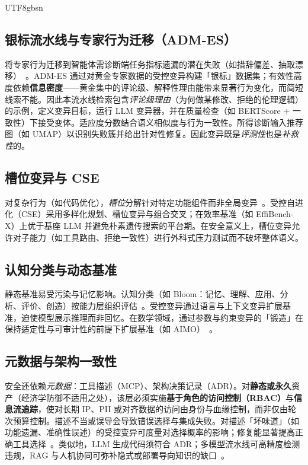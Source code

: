 \documentclass[letterpaper,twocolumn,10pt]{article}
\begin{document}
\begin{CJK}{UTF8}{gbsn}
\subsection{银标流水线与专家行为迁移（ADM-ES）}

将专家行为迁移到智能体需诊断端任务指标遗漏的潜在失败（如措辞偏差、抽取漂移）~\cite{adm-es-arxiv}。ADM-ES 通过对黄金专家数据的受控变异构建「银标」数据集；有效性高度依赖\textbf{信息密度}——黄金集中的评论级、解释性理由能带来显著行为变化，而简短线索不能。因此本流水线检索包含\emph{评论级理由}（为何做某修改、拒绝的伦理逻辑）的示例，定义变异目标，运行 LLM 变异器，并在质量检查（如 BERTScore + 一致性）下接受变体。适应度分数结合语义相似度与行为一致性。所得诊断输入推荐图（如 UMAP）以识别失败簇并给出针对性修复。因此变异既是\emph{评测性}也是\emph{补救性}的。

\subsection{槽位变异与 CSE}

对复杂行为（如代码优化），\emph{槽位}分解针对特定功能组件而非全局变异~\cite{cse-evocontrol,cse-arxiv}。受控自进化（CSE）采用多样化规划、槽位变异与组合交叉；在效率基准（如 EffiBench-X）上优于基座 LLM 并避免朴素遗传搜索的平台期。在安全意义上，槽位变异允许对子能力（如工具路由、拒绝一致性）进行外科式压力测试而不破坏整体语义。

\subsection{认知分类与动态基准}

静态基准易受污染与记忆影响。认知分类（如 Bloom：记忆、理解、应用、分析、评价、创造）按能力层组织评估~\cite{bloom-bugreport}。受控变异通过语言与上下文变异扩展基准，迫使模型展示推理而非回忆。在数学领域，通过参数与约束变异的「锻造」在保持适定性与可审计性的前提下扩展基准（如 AIMO）~\cite{aimo-benchmark}。

\subsection{元数据与架构一致性}
\label{sec:metadata}

安全还依赖\emph{元数据}：工具描述（MCP）、架构决策记录（ADR）。对\textbf{静态或永久}资产（经济学防御不适用之处），该层必须实施\textbf{基于角色的访问控制（RBAC）}与\textbf{信息流追踪}，使对长期 IP、PII 或对齐数据的访问由身份与血缘控制，而非仅由轮次预算控制。描述不当或误导会导致错误选择与集成失败。对描述「坏味道」（如功能遗漏、准确性误述）的受控变异可度量对选择概率的影响；修复能显著提高正确工具选择~\cite{mcp-smell-arxiv}。类似地，LLM 生成代码须符合 ADR；多模型流水线可高精度检测违规，RAG 与人机协同可弥补隐式或部署导向知识的缺口~\cite{adr-violation,mission-critical-rag}。


\end{CJK}
\end{document}
